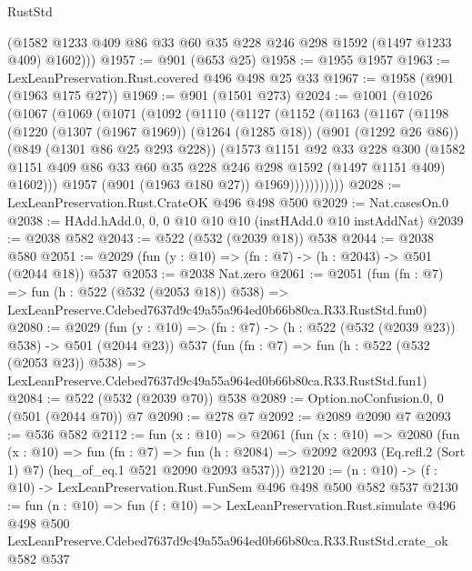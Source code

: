 \begin{lexlean}{RustStd}
\begin{coremodule}
        (@1582 @1233 @409 @86 @33 @60 @35 @228 @246 @298 @1592 (@1497 @1233 @409) @1602)))
@1957 := @901 (@653 @25)
@1958 := @1955 @1957
@1963 := LexLeanPreservation.Rust.covered @496 @498 @25 @33
@1967 := @1958 (@901 (@1963 @175 @27))
@1969 := @901 (@1501 @273)
@2024 := @1001
    (@1026
      (@1067
        (@1069
          (@1071
            (@1092
              (@1110
                (@1127
                  (@1152
                    (@1163
                      (@1167
                        (@1198
                          (@1220
                            (@1307 (@1967 @1969))
                            (@1264 (@1285 @18))
                            (@901 (@1292 @26 @86))
                            (@849 (@1301 @86 @25 @293 @228))
                            (@1573
                              @1151
                              @92
                              @33
                              @228
                              @300
                              (@1582
                                @1151
                                @409
                                @86
                                @33
                                @60
                                @35
                                @228
                                @246
                                @298
                                @1592
                                (@1497 @1151 @409)
                                @1602)))
                          @1957
                          (@901 (@1963 @180 @27))
                          @1969)))))))))))
@2028 := LexLeanPreservation.Rust.CrateOK @496 @498 @500
@2029 := Nat.casesOn.{0}
@2038 := HAdd.hAdd.{0, 0, 0} @10 @10 @10 (instHAdd.{0} @10 instAddNat)
@2039 := @2038 @582
@2043 := @522 (@532 (@2039 @18)) @538
@2044 := @2038 @580
@2051 := @2029 (fun (y : @10) => (fn : @7) -> (h : @2043) -> @501 (@2044 @18)) @537
@2053 := @2038 Nat.zero
@2061 := @2051
    (fun (fn : @7) =>
    fun (h : @522 (@532 (@2053 @18)) @538) =>
    LexLeanPreserve.Cdebed7637d9c49a55a964ed0b66b80ca.R33.RustStd.fun0)
@2080 := @2029
    (fun (y : @10) => (fn : @7) -> (h : @522 (@532 (@2039 @23)) @538) -> @501 (@2044 @23))
    @537
    (fun (fn : @7) =>
    fun (h : @522 (@532 (@2053 @23)) @538) =>
    LexLeanPreserve.Cdebed7637d9c49a55a964ed0b66b80ca.R33.RustStd.fun1)
@2084 := @522 (@532 (@2039 @70)) @538
@2089 := Option.noConfusion.{0, 0} (@501 (@2044 @70)) @7
@2090 := @278 @7
@2092 := @2089 @2090 @7
@2093 := @536 @582
@2112 := fun (x : @10) =>
  @2061
    (fun (x : @10) =>
    @2080
      (fun (x : @10) =>
      fun (fn : @7) =>
      fun (h : @2084) =>
      @2092 @2093 (Eq.refl.{2} (Sort 1) @7) (heq_of_eq.{1} @521 @2090 @2093 @537)))
@2120 := (n : @10) -> (f : @10) -> LexLeanPreservation.Rust.FunSem @496 @498 @500 @582 @537
@2130 := fun (n : @10) =>
  fun (f : @10) =>
  LexLeanPreservation.Rust.simulate
    @496
    @498
    @500
    LexLeanPreserve.Cdebed7637d9c49a55a964ed0b66b80ca.R33.RustStd.crate_ok
    @582
    @537
\end{coremodule}
\end{lexlean}
